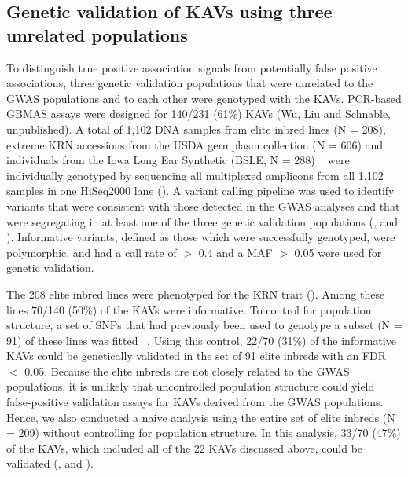 \documentclass[10pt,letterpaper]{article}
\begin{document}
\subsection*{Genetic validation of KAVs using three unrelated populations}
To distinguish true positive association signals from potentially false positive associations, three genetic validation populations that were unrelated to the GWAS populations and to each other were genotyped with the KAVs. PCR-based GBMAS assays were designed for 140/231 (61\%) KAVs (Wu, Liu and Schnable, unpublished). A total of 1,102 DNA samples from elite inbred lines (N = 208), extreme KRN accessions from the USDA germplasm collection (N = 606) and individuals from the Iowa Long Ear Synthetic (BSLE, N = 288) ~\cite{Hallauer2005} were individually genotyped by sequencing all multiplexed amplicons from all 1,102 samples in one HiSeq2000 lane (). A variant calling pipeline was used to identify variants that were consistent with those detected in the GWAS analyses and that were segregating in at least one of the three genetic validation populations (,  and ). Informative variants, defined as those which were successfully genotyped, were polymorphic, and had a call rate of  $>$ 0.4 and a MAF $>$ 0.05 were used for genetic validation.

The 208 elite inbred lines were phenotyped for the KRN trait (). Among these lines 70/140 (50\%) of the KAVs were informative. To control for population structure, a set of SNPs that had previously been used to genotype a subset (N = 91) of these lines was fitted ~\cite{Nelson2008}. Using this control, 22/70 (31\%) of the informative KAVs could be genetically validated in the set of 91 elite inbreds with an FDR $<$ 0.05. Because the elite inbreds are not closely related to the GWAS populations, it is unlikely that uncontrolled population structure could yield false-positive validation assays for KAVs derived from the GWAS populations. Hence, we also conducted a naive analysis using the entire set of elite inbreds (N = 209) without controlling for population structure. In this analysis, 33/70 (47\%) of the KAVs, which included all of the 22 KAVs discussed above, could be validated (,  and ). 
\end{document}

